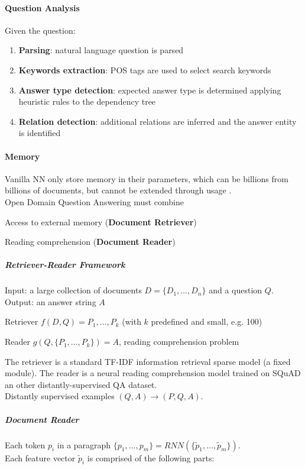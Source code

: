 \documentclass[10pt]{report}
\begin{document}
\paragraph{Question Analysis} Given the question:
\begin{enumerate}
	\item \textbf{Parsing}: natural language question is parsed
	\item \textbf{Keywords extraction}: POS tags are used to select search keywords
	\item \textbf{Answer type detection}: expected answer type is determined applying heuristic rules to the dependency tree
	\item \textbf{Relation detection}: additional relations are inferred and the answer entity is identified
\end{enumerate}
\paragraph{Memory} Vanilla NN only store memory in their parameters, which can be billions from billions of documents, but cannot be extended through usage
.\\
Open Domain Question Answering must combine\begin{list}{}{}
	\item Access to external memory (\textbf{Document Retriever})
	\item Reading comprehension (\textbf{Document Reader})
\end{list}
\subparagraph{Retriever-Reader Framework} Input: a large collection of documents $D = \{D_1,\ldots,D_n\}$ and a question $Q$.\\
Output: an answer string $A$
\begin{list}{}{}
	\item Retriever $f(D,Q) = P_1,\ldots,P_k$ (with $k$ predefined and small, e.g. 100)
	\item Reader $g(Q, \{P_1,\ldots,P_k\}) = A$, reading comprehension problem
\end{list}
The retriever is a standard TF-IDF information retrieval sparse model (a fixed module). The reader is a neural reading comprehension model trained on SQuAD an other distantly-supervised QA dataset.\\
Distantly supervised examples $(Q,A)\rightarrow (P,Q,A)$.
\subparagraph{Document Reader} Each token $p_i$ in a paragraph $\{p_1,\ldots,p_m\}=RNN(\{\tilde{p}_1,\ldots,\tilde{p}_m\})$.\\
Each feature vector $\tilde{p}_i$ is comprised of the following parts:
\end{document}
